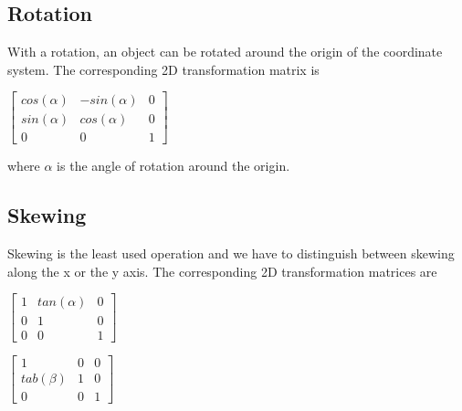 \subsection{Rotation}
With a rotation, an object can be rotated around the origin of the coordinate system.
The corresponding 2D transformation matrix is

\hspace*{0.4cm}
\begin{center}
\begin{math}\left[ \begin{array}{ccc} cos(\alpha) & -sin(\alpha) & 0 \\ sin(\alpha) & cos(\alpha) & 0 \\ 0 & 0 & 1\end{array}\right]\end{math}
\end{center}
\hspace*{0.4cm}

where $\alpha$ is the angle of rotation around the origin.

\subsection{Skewing}
Skewing is the least used operation and we have to distinguish between skewing along the x or the y axis.
The corresponding 2D transformation matrices are

\hspace*{0.4cm}
\begin{center}
\begin{math}\left[ \begin{array}{ccc} 1 & tan(\alpha) & 0 \\ 0 & 1 & 0 \\ 0 & 0 & 1\end{array}\right]\end{math}
\end{center}
\hspace*{0.4cm}


\hspace*{0.4cm}
\begin{center}
\begin{math}\left[ \begin{array}{ccc} 1 & 0 & 0 \\ tab(\beta) & 1 & 0 \\ 0 & 0 & 1\end{array}\right]\end{math}
\end{center}
\hspace*{0.4cm}

